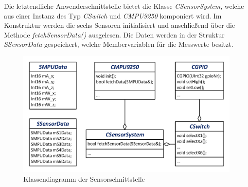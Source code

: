 Die letztendliche Anwenderschnittstelle bietet die Klasse \textit{CSensorSystem}, welche aus einer Instanz des Typ \textit{CSwitch} und \textit{CMPU9250} komponiert wird. Im Konstruktur werden die sechs Sensoren initialisiert und anschließend über die Methode \textit{fetchSensorData()} ausgelesen. Die Daten werden in der Struktur \textit{SSensorData} gespeichert, welche Membervariablen für die Messwerte besitzt.
\begin{figure}[!h]
\centering
\includegraphics[width=0.7\linewidth]{img/SW_0_Sensoren_KD.pdf}
\caption{Klassendiagramm der Sensorschnittstelle}
\end{figure}


